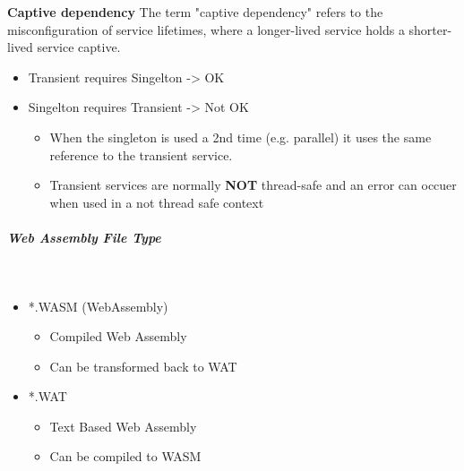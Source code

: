 \documentclass[11pt,twoside,landscape]{article}
\begin{document}
\begin{multicols}{4}
\textbf{Captive dependency}
The term "captive dependency" refers to the misconfiguration of service lifetimes, where a longer-lived service holds a shorter-lived service captive.
\begin{itemize}
\item Transient requires Singelton -> OK
\item Singelton requires Transient -> Not OK
\begin{itemize}
\item When the singleton is used a 2nd time (e.g. parallel) it uses the same reference to the transient service.
\item Transient services are normally \textbf{NOT} thread-safe and an error can occuer when used in a not thread safe context
\end{itemize}
\end{itemize}
\subparagraph{Web Assembly File Type} \
\label{sec:orgbd53f45}
\begin{itemize}
\item *.WASM (WebAssembly)
\begin{itemize}
\item Compiled Web Assembly
\item Can be transformed back to WAT
\end{itemize}

\item *.WAT
\begin{itemize}
\item Text Based Web Assembly
\item Can be compiled to WASM
\end{itemize}


\end{itemize}
\end{multicols}
\end{document}
